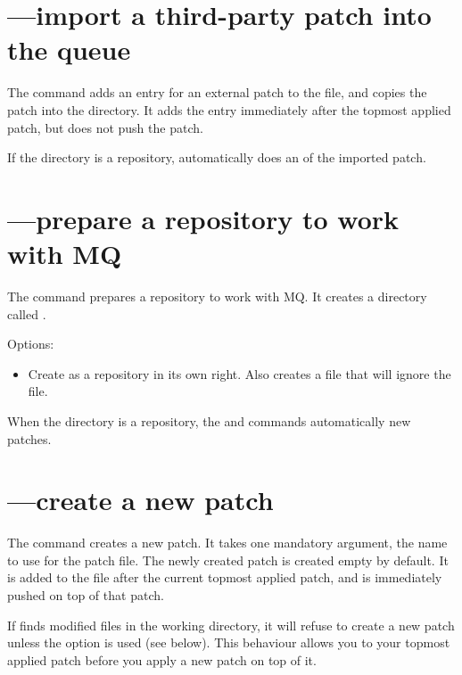 \section{---import a third-party patch into the queue}

The  command adds an entry for an external patch to the
 file, and copies the patch into the
 directory.  It adds the entry immediately after
the topmost applied patch, but does not push the patch.

If the  directory is a repository,
 automatically does an  of the imported
patch.

\section{---prepare a repository to work with MQ}

The  command prepares a repository to work with MQ.  It
creates a directory called .

Options:
\begin{itemize}
\item[\hgxopt{mq}{qinit}{-c}] Create  as a repository
  in its own right.  Also creates a  file that
  will ignore the  file.
\end{itemize}

When the  directory is a repository, the
 and  commands automatically 
new patches.

\section{---create a new patch}

The  command creates a new patch.  It takes one mandatory
argument, the name to use for the patch file.  The newly created patch
is created empty by default.  It is added to the 
file after the current topmost applied patch, and is immediately
pushed on top of that patch.

If  finds modified files in the working directory, it will
refuse to create a new patch unless the  option is
used (see below).  This behaviour allows you to  your
topmost applied patch before you apply a new patch on top of it.

